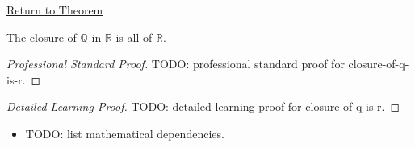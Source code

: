 \newpage
{}
\label{prf:closure-of-q-is-r}

\begin{remark*}[Return]
\hyperref[thm:closure-of-q-is-r]{Return to Theorem}
\end{remark*}

\begin{theorem*}[Closure of $Q$ in $R$]
The closure of $\mathbb{Q}$ in $\mathbb{R}$ is all of $\mathbb{R}$.
\end{theorem*}

\begin{proof}[Professional Standard Proof]
\LRAProofBodyStart
TODO: professional standard proof for closure-of-q-is-r.
\end{proof}

\begin{proof}[Detailed Learning Proof]
\LRAProofBodyStart
TODO: detailed learning proof for closure-of-q-is-r.
\end{proof}

\begin{remark*}
\end{remark*}

\begin{dependencies}
\begin{itemize}
  \item TODO: list mathematical dependencies.
\end{itemize}
\end{dependencies}

\clearpage
